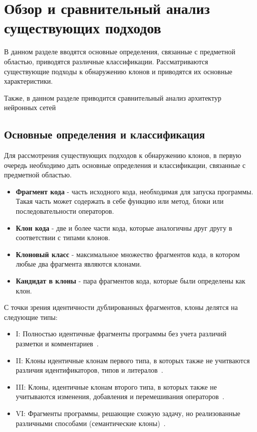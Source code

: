 \chapter{Обзор и сравнительный анализ существующих подходов}
В данном разделе вводятся основные определения, связанные с предметной областью, приводятся различные классификации. Рассматриваются существующие подходы к обнаружению клонов и приводятся их основные характеристики.

Также, в данном разделе приводится сравнительный анализ архитектур нейронных сетей
\section{Основные определения и классификация}

Для рассмотрения существующих подходов к обнаружению клонов, в первую очередь необходимо дать основные определения и классификации, связанные с предметной областью. 

\begin{itemize}
\setlength\itemsep{0mm}
\item \textbf{Фрагмент кода} - часть исходного кода, необходимая для запуска программы. Такая часть может содержать в себе функцию или метод, блоки или последовательности операторов.
\item \textbf{Клон кода} - две и более части кода, которые аналогичны друг другу в соответствии с типами клонов.
\item \textbf{Клоновый класс} - максимальное множество фрагментов кода, в котором любые два фрагмента являются клонами.
\item \textbf{Кандидат в клоны} - пара фрагментов кода, которые были определены как клон.
\end{itemize}

С точки зрения идентичности дублированных фрагментов, клоны делятся на следующие типы:
\begin{itemize}
\setlength\itemsep{0mm}
\item I: Полностью идентичные фрагменты программы без учета различий разметки и комментариев~\cite{akhinitsykson, surveyroyandcordy}.
\item II: Клоны идентичные клонам первого типа, в которых также не учитваются различия идентификаторов, типов и литералов~\cite{akhinitsykson, surveyroyandcordy}.
\item III: Клоны, идентичные клонам второго типа, в которых также не учитываются изменения, добавления и перемешивания операторов~\cite{akhinitsykson, surveyroyandcordy}.
\item VI: Фрагменты программы, решающие схожую задачу, но реализованные различными способами (семантические клоны)~\cite{akhinitsykson, surveyroyandcordy}.
\end{itemize}

